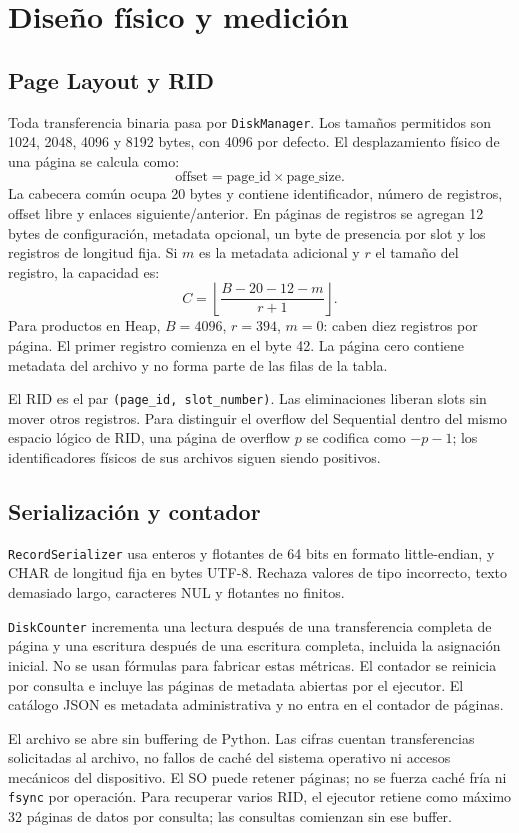 \section{Diseño físico y medición}
\subsection{Page Layout y RID}
Toda transferencia binaria pasa por \texttt{DiskManager}. Los tamaños permitidos son 1024, 2048, 4096 y 8192 bytes, con 4096 por defecto. El desplazamiento físico de una página se calcula como:
\[\text{offset}=\text{page\_id}\times\text{page\_size}.\]
La cabecera común ocupa 20 bytes y contiene identificador, número de registros, offset libre y enlaces siguiente/anterior. En páginas de registros se agregan 12 bytes de configuración, metadata opcional, un byte de presencia por slot y los registros de longitud fija. Si $m$ es la metadata adicional y $r$ el tamaño del registro, la capacidad es:
\[C=\left\lfloor\frac{B-20-12-m}{r+1}\right\rfloor.\]
Para productos en Heap, $B=4096$, $r=394$, $m=0$: caben diez registros por página. El primer registro comienza en el byte 42. La página cero contiene metadata del archivo y no forma parte de las filas de la tabla.

El RID es el par \texttt{(page\_id, slot\_number)}. Las eliminaciones liberan slots sin mover otros registros. Para distinguir el overflow del Sequential dentro del mismo espacio lógico de RID, una página de overflow $p$ se codifica como $-p-1$; los identificadores físicos de sus archivos siguen siendo positivos.

\subsection{Serialización y contador}
\texttt{RecordSerializer} usa enteros y flotantes de 64 bits en formato little-endian, y CHAR de longitud fija en bytes UTF-8. Rechaza valores de tipo incorrecto, texto demasiado largo, caracteres NUL y flotantes no finitos.

\texttt{DiskCounter} incrementa una lectura después de una transferencia completa de página y una escritura después de una escritura completa, incluida la asignación inicial. No se usan fórmulas para fabricar estas métricas. El contador se reinicia por consulta e incluye las páginas de metadata abiertas por el ejecutor. El catálogo JSON es metadata administrativa y no entra en el contador de páginas.

El archivo se abre sin buffering de Python. Las cifras cuentan transferencias solicitadas al archivo, no fallos de caché del sistema operativo ni accesos mecánicos del dispositivo. El SO puede retener páginas; no se fuerza caché fría ni \texttt{fsync} por operación. Para recuperar varios RID, el ejecutor retiene como máximo 32 páginas de datos por consulta; las consultas comienzan sin ese buffer.
